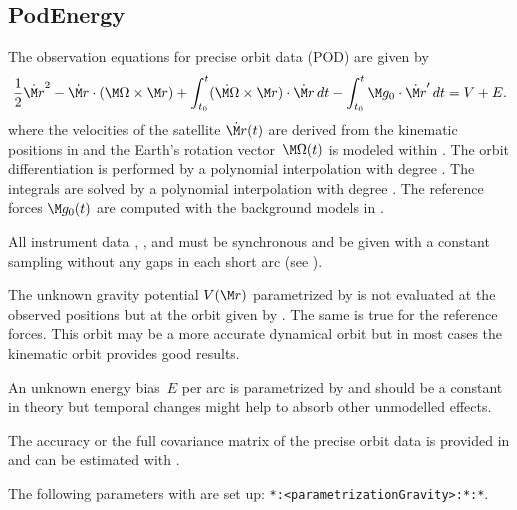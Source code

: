\subsection{PodEnergy}\label{observationType:podEnergy}
The observation equations for precise orbit data (POD) are given by
\begin{equation}
  \frac{1}{2}\dot{\M r}^2
  -\dot{\M r} \cdot (\M\Omega\times\M r)
  +\int_{t_0}^t(\dot{\M\Omega}\times\M r)\cdot \dot{\M r}\,dt
  - \int_{t_0}^t \M g_0 \cdot\dot{\M r}'\,dt
  = V + E.
\end{equation}
where the velocities of the satellite $\dot{\M r}(t)$ are derived from
the kinematic positions in  and the Earth's rotation vector~$\M\Omega(t)$ is modeled
within . The orbit differentiation is
performed by a polynomial interpolation with degree .
The integrals are solved by a polynomial interpolation with degree .
The reference forces $\M g_0(t)$ are computed with the background models in .

All instrument data , , and 
must be synchronous and be given with a constant sampling without any gaps in each short arc
(see ).

The unknown gravity potential $V(\M r)$ parametrized by 
is not evaluated at the observed positions but at the orbit given by .
The same is true for the reference forces. This orbit may be a more accurate dynamical orbit but
in most cases the kinematic orbit provides good results.

An unknown energy bias~$E$ per arc is parametrized by 
and should be a constant in theory but temporal changes might help to absorb other unmodelled effects.

The accuracy or the full covariance matrix of the precise orbit data is provided in
 and can be estimated with .

The following parameters with  are set up:
\verb|*:<parametrizationGravity>:*:*|.


